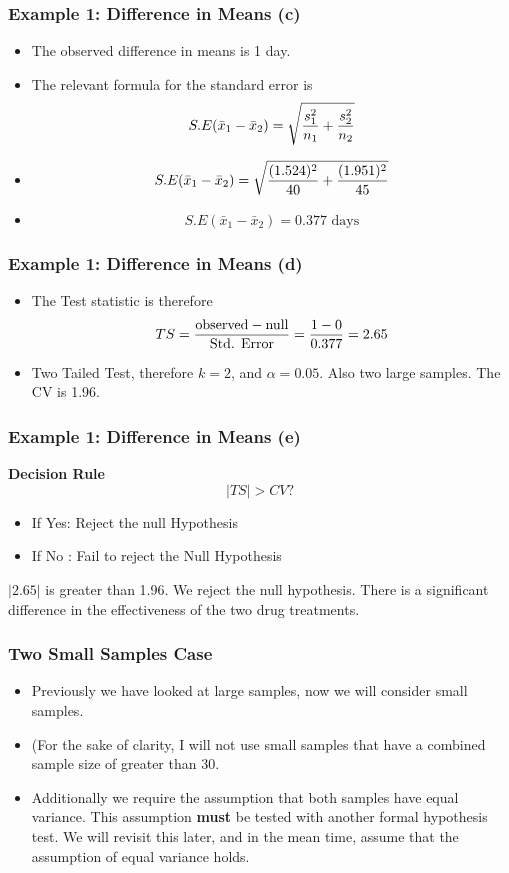 \begin{frame}
\frametitle{Example 1: Difference in Means (c) }
\begin{itemize}
\item The observed difference in means is 1 day.
\item The relevant formula for the standard error is
\[ S.E(\bar{x}_1 - \bar{x}_2) = \sqrt{{s^2_1\over n_1}+{s^2_2 \over n_2}} \]
\item  \[ S.E(\bar{x}_1 - \bar{x}_2) = \sqrt{{(1.524)^2 \over 40}+{(1.951)^2 \over 45}}   \]
\item  \[ S.E(\bar{x}_1 - \bar{x}_2) = 0.377\mbox{ days}\]
\end{itemize}
\end{frame}
\begin{frame}
\frametitle{Example 1: Difference in Means (d) }
\begin{itemize}
\item The Test statistic is therefore
\[ TS = {\mbox{observed} - \mbox{null} \over \mbox{Std. Error}}  = {1 - 0 \over 0.377 } = 2.65 \]
\item Two Tailed Test, therefore $k = 2$, and $\alpha = 0.05$. Also two large samples. The CV is 1.96.
\end{itemize}
\end{frame}


\begin{frame}
\frametitle{Example 1: Difference in Means (e) }
\textbf{Decision Rule}
\[ |TS| > CV ?  \]
\begin{itemize}
\item If Yes: Reject the null Hypothesis
\item If No : Fail to reject the Null Hypothesis
\end{itemize}
$|2.65|$ is greater than 1.96. We reject the null hypothesis. There is a significant difference in the effectiveness of the two drug treatments.
\end{frame}




\begin{frame}
\frametitle{Two Small Samples Case}
\begin{itemize}
\item Previously we have looked at large samples, now we will consider small samples.
\item (For the sake of clarity, I will not use small samples that have a combined sample size of greater than 30.
\item Additionally we require the assumption that both samples have equal variance. This assumption \textbf{must} be tested with another formal hypothesis test. We will revisit this later, and in the mean time, assume that the assumption of equal variance holds.
\end{itemize}
\end{frame}

